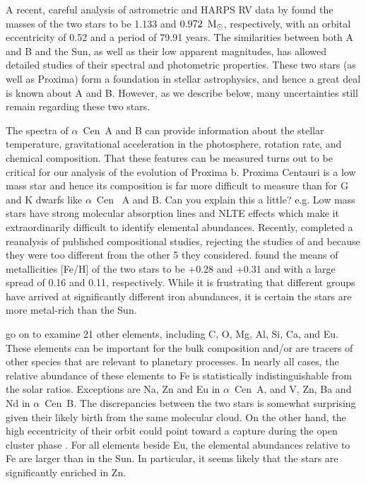 \documentclass[preprint,12pt]{aastex}
\newcommand{\xxx}[1]{{\color{red} #1}} %
\def\msun{{\rm\,M_\odot}}
\def\eg{{\it e.g.\ }}
\def\acen{{$\alpha$~Cen}}
\begin{document}
A recent, careful analysis of astrometric and HARPS RV data by
\cite{PourbaixBoffin16} found the masses of the two stars to be 1.133
and $0.972~\msun$, respectively, with an orbital eccentricity of 0.52
and a period of 79.91 years. The similarities between both A and B and
the Sun, as well as their low apparent magnitudes, has allowed
detailed studies of their spectral and photometric properties. These
two stars (as well as Proxima) form a foundation in stellar astrophysics,
and hence a great deal is known about A and B. However, as we describe
below, many uncertainties still remain regarding these two stars.

The spectra of \acen~A and B can provide information about the stellar
temperature, gravitational acceleration in the photosphere, rotation
rate, and chemical composition. That these features can be measured turns out
to be critical for our analysis of the evolution of Proxima b. Proxima
Centauri is a low mass star and hence its composition is far more
difficult to measure than for G and K dwarfs like \acen~ A and
B. \xxx{Can you explain this a little? e.g. Low mass stars have strong molecular absorption lines 
and NLTE effects which make it extraordinarily difficult to identify elemental abundances}. 
Recently, \cite{HinkelKane13} completed a reanalysis of published
compositional studies, rejecting the studies of \cite{Laird85} and
\cite{NeuforgeMagain97} because they were too different from the
other 5 they considered.  \cite{HinkelKane13} found the means of metallicities [Fe/H]
of the two stars to be +0.28 and +0.31 and with a large spread of 0.16
and 0.11, respectively. While it is frustrating that different groups
have arrived at significantly different iron abundances, it is certain
the stars are more metal-rich than the Sun. 

\cite{HinkelKane13} go on to examine 21 other elements, including C,
O, Mg, Al, Si, Ca, and Eu. These elements can be important for the
bulk composition and/or are tracers of other species that are relevant
to planetary processes. In nearly all cases, the relative abundance of
these elements to Fe is statistically indistinguishable from the solar
ratios. Exceptions are Na, Zn and Eu in \acen~A, and V, Zn, Ba
and Nd in \acen~B. The discrepancies between the two stars is
somewhat surprising given their likely birth from the same molecular
cloud. On the other hand, the high eccentricity of their orbit could
point toward a capture during the open cluster phase \citep[\eg][]{Malmberg07}. For all
elements beside Eu, the elemental abundances relative to Fe are larger
than in the Sun. In particular, it seems likely that the stars are
significantly enriched in Zn.
\end{document}
